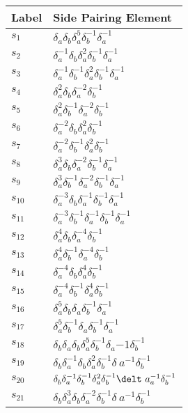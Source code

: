\documentclass{article}
\begin{document}
\begin{center}
\hfill
\begin{tabular}{ll}
\toprule
Label & Side Pairing Element\\
\midrule
$s_{1}$ & $\delta_a^{}\delta_b^{}\delta_a^{5}\delta_b^{-1}\delta_a^{-1}$ \\
$s_{2}$ & $\delta_a^{-1}\delta_b^{}\delta_a^{2}\delta_b^{-1}\delta_a^{-1}$ \\
$s_{3}$ & $\delta_a^{-1}\delta_b^{-1}\delta_a^{2}\delta_b^{-1}\delta_a^{-1}$ \\
$s_{4}$ & $\delta_a^{2}\delta_b^{}\delta_a^{-2}\delta_b^{-1}$ \\
$s_{5}$ & $\delta_a^{2}\delta_b^{-1}\delta_a^{-2}\delta_b^{-1}$ \\
$s_{6}$ & $\delta_a^{-2}\delta_b^{}\delta_a^{2}\delta_b^{-1}$ \\
$s_{7}$ & $\delta_a^{-2}\delta_b^{-1}\delta_a^{2}\delta_b^{-1}$ \\
$s_{8}$ & $\delta_a^{3}\delta_b^{}\delta_a^{-2}\delta_b^{-1}\delta_a^{-1}$ \\
$s_{9}$ & $\delta_a^{3}\delta_b^{-1}\delta_a^{-2}\delta_b^{-1}\delta_a^{-1}$ \\
$s_{10}$ & $\delta_a^{-3}\delta_b^{}\delta_a^{-1}\delta_b^{-1}\delta_a^{-1}$ \\
$s_{11}$ & $\delta_a^{-3}\delta_b^{-1}\delta_a^{-1}\delta_b^{-1}\delta_a^{-1}$ 
\\
$s_{12}$ & $\delta_a^{4}\delta_b^{}\delta_a^{-4}\delta_b^{-1}$ \\
$s_{13}$ & $\delta_a^{4}\delta_b^{-1}\delta_a^{-4}\delta_b^{-1}$ \\
$s_{14}$ & $\delta_a^{-4}\delta_b^{}\delta_a^{4}\delta_b^{-1}$ \\
$s_{15}$ & $\delta_a^{-4}\delta_b^{-1}\delta_a^{4}\delta_b^{-1}$ \\
$s_{16}$ & $\delta_a^{5}\delta_b^{}\delta_a^{}\delta_b^{-1}\delta_a^{-1}$ \\
$s_{17}$ & $\delta_a^{5}\delta_b^{-1}\delta_a^{}\delta_b^{-1}\delta_a^{-1}$ \\
$s_{18}$ & $\delta_b^{}\delta_a^{}\delta_b^{}\delta_a^{5}\delta_b^{-1}\delta_a^\
{-1}\delta_b^{-1}$ \\
$s_{19}$ & $\delta_b^{}\delta_a^{-1}\delta_b^{}\delta_a^{2}\delta_b^{-1}\delta_\
a^{-1}\delta_b^{-1}$ \\
$s_{20}$ & $\delta_b^{}\delta_a^{-1}\delta_b^{-1}\delta_a^{2}\delta_b^{-1}\delt\
a_a^{-1}\delta_b^{-1}$ \\
$s_{21}$ & $\delta_b^{}\delta_a^{3}\delta_b^{}\delta_a^{-2}\delta_b^{-1}\delta_\
a^{-1}\delta_b^{-1}$ \\

\end{tabular}
\end{center}
\end{document}
